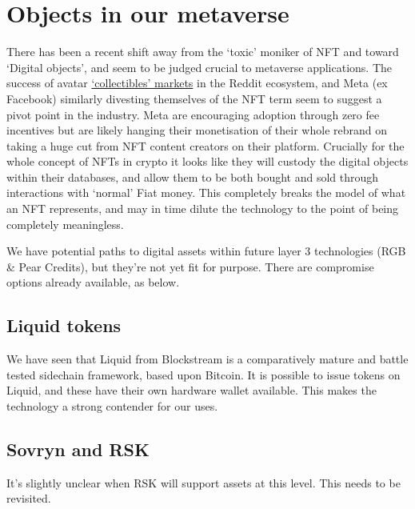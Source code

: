 \section{Objects in our metaverse}
There has been a recent shift away from the `toxic' moniker of NFT and toward `Digital objects', and seem to be judged crucial to metaverse applications. The success of avatar \href{https://medium.com/coinmonks/reddit-nft-success-ca2685163576}{`collectibles' markets} in the Reddit ecosystem, and Meta (ex Facebook) similarly divesting themselves of the NFT term seem to suggest a pivot point in the industry. Meta are encouraging adoption through zero fee incentives but are likely hanging their monetisation of their whole rebrand on taking a huge cut from NFT content creators on their platform. Crucially for the whole concept of NFTs in crypto it looks like they will custody the digital objects within their databases, and allow them to be both bought and sold through interactions with `normal' Fiat money. This completely breaks the model of what an NFT represents, and may in time dilute the technology to the point of being completely meaningless.\par
We have potential paths to digital assets within future layer 3 technologies (RGB \& Pear Credits), but they're not yet fit for purpose. There are compromise options already available, as below. 
\subsection{Liquid tokens}
We have seen that Liquid from Blockstream is a comparatively mature and battle tested sidechain framework, based upon Bitcoin. It is possible to issue tokens on Liquid, and these have their own hardware wallet available. This makes the technology a strong contender for our uses.
\subsection{Sovryn and RSK}
It's slightly unclear when RSK will support assets at this level. This needs to be revisited.
